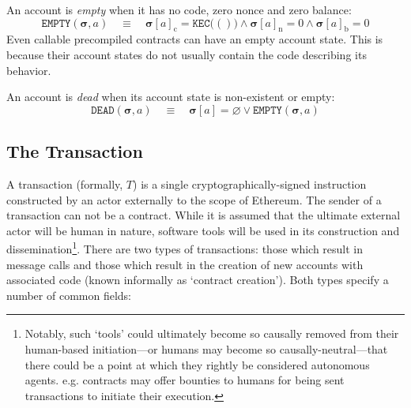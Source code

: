 \documentclass[9pt,oneside]{amsart}
\makeatletter
\newcommand*\eg{e.g.\@\xspace}
\makeatother
\begin{document}
\begin{multicols}{2}
An account is \textit{empty} when it has no code, zero nonce and zero balance:
\begin{equation}
\mathtt{EMPTY}(\boldsymbol{\sigma}, a) \quad\equiv\quad \boldsymbol{\sigma}[a]_{\mathrm{c}} = \texttt{KEC}\big(()\big) \wedge \boldsymbol{\sigma}[a]_{\mathrm{n}} = 0 \wedge \boldsymbol{\sigma}[a]_{\mathrm{b}} = 0
\end{equation}
Even callable precompiled contracts can have an empty account state. This is because their account states do not usually contain the code describing its behavior.

An account is \textit{dead} when its account state is non-existent or empty:
\begin{equation}
\mathtt{DEAD}(\boldsymbol{\sigma}, a) \quad\equiv\quad \boldsymbol{\sigma}[a] = \varnothing \vee \mathtt{EMPTY}(\boldsymbol{\sigma}, a)
\end{equation}

\subsection{The Transaction} \label{subsec:transaction}

A transaction (formally, $T$) is a single cryptographically-signed instruction constructed by an actor externally to the scope of Ethereum. The sender of a transaction can not be a contract. While it is assumed that the ultimate external actor will be human in nature, software tools will be used in its construction and dissemination\footnote{Notably, such `tools' could ultimately become so causally removed from their human-based initiation---or humans may become so causally-neutral---that there could be a point at which they rightly be considered autonomous agents. \eg contracts may offer bounties to humans for being sent transactions to initiate their execution.}. There are two types of transactions: those which result in message calls and those which result in the creation of new accounts with associated code (known informally as `contract creation'). Both types specify a number of common fields:


\end{multicols}
\end{document}
